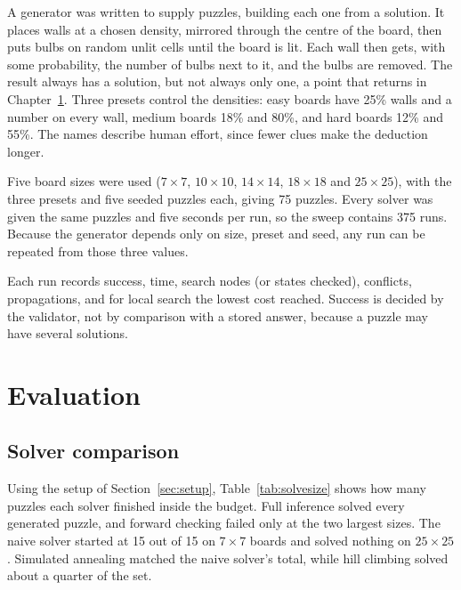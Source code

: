 \documentclass[12pt]{report}
\begin{document}
A generator was written to supply puzzles, building each one from a solution. It places
walls at a chosen density, mirrored through the centre of the board, then puts bulbs on
random unlit cells until the board is lit. Each wall then gets, with some
probability, the number of bulbs next to it, and the bulbs are removed. The result always
has a solution, but not always only one, a point that returns in
Chapter~\ref{chap:results}. Three presets control the densities: easy boards have 25\%
walls and a number on every wall, medium boards 18\% and 80\%, and hard boards 12\% and
55\%. The names describe human effort, since fewer clues make the deduction longer.

Five board sizes were used ($7\times7$, $10\times10$, $14\times14$, $18\times18$ and
$25\times25$), with the three presets and five seeded puzzles each, giving 75 puzzles.
Every solver was given the same puzzles and five seconds per run, so the sweep contains 375
runs. Because the generator depends only on size, preset and seed, any run can be repeated
from those three values.

Each run records success, time, search nodes (or states checked), conflicts, propagations,
and for local search the lowest cost reached. Success is decided by the validator, not by
comparison with a stored answer, because a puzzle may have several solutions.


\chapter{Evaluation}
\label{chap:results}

\section{Solver comparison}

Using the setup of Section~\ref{sec:setup}, Table~\ref{tab:solvesize} shows how many
puzzles each solver finished inside the budget. Full inference solved every generated
puzzle, and forward checking failed only at the two largest sizes. The naive solver started at
15 out of 15 on $7\times7$ boards and solved nothing on $25\times25$. Simulated annealing
matched the naive solver's total, while hill climbing solved about a quarter of the set.
\end{document}
